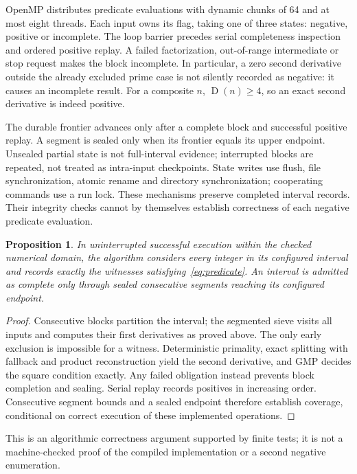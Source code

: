 \documentclass[11pt]{article}
\newcommand{\D}{\operatorname{D}}
\newtheorem{proposition}[theorem]{Proposition}
\theoremstyle{definition}
\begin{document}
OpenMP distributes predicate evaluations with dynamic chunks of 64 and
at most eight threads. Each input owns its flag, taking one of three
states: negative, positive or incomplete. The loop barrier precedes
serial completeness inspection and ordered positive replay. A failed
factorization, out-of-range intermediate or stop request makes the block
incomplete. In particular, a zero second derivative outside the already
excluded prime case is not silently recorded as negative: it causes an
incomplete result. For a composite $n$, $\D(n)\ge4$, so an exact second
derivative is indeed positive.

The durable frontier advances only after a complete block and successful
positive replay. A segment is sealed only when its frontier equals its
upper endpoint. Unsealed partial state is not full-interval evidence;
interrupted blocks are repeated, not treated as intra-input checkpoints.
State writes use flush, file synchronization, atomic rename and directory
synchronization; cooperating commands use a run lock. These mechanisms
preserve completed interval records. Their integrity checks cannot by
themselves establish correctness of each negative predicate evaluation.

\begin{proposition}\label{prop:scan}
In uninterrupted successful execution within the checked numerical
domain, the algorithm considers every integer in its configured interval
and records exactly the witnesses satisfying~\eqref{eq:predicate}.
An interval is admitted as complete only through sealed consecutive
segments reaching its configured endpoint.
\end{proposition}
\begin{proof}
Consecutive blocks partition the interval; the segmented sieve visits all
inputs and computes their first derivatives as proved above. The only
early exclusion is impossible for a witness. Deterministic primality,
exact splitting with fallback and product reconstruction yield the second
derivative, and GMP decides the square condition exactly. Any failed
obligation instead prevents block completion and sealing. Serial replay
records positives in increasing order. Consecutive segment bounds and a
sealed endpoint therefore establish coverage, conditional on correct
execution of these implemented operations.
\end{proof}
This is an algorithmic correctness argument supported by finite tests;
it is not a machine-checked proof of the compiled implementation or a
second negative enumeration.
\end{document}
